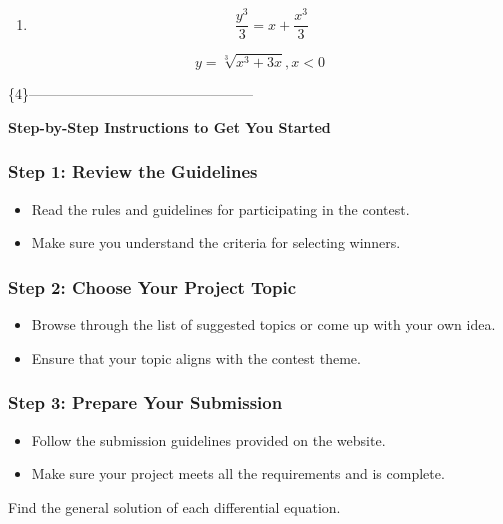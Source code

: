 \documentclass[
]{article}
\providecommand{\tightlist}{%
  \setlength{\itemsep}{0pt}\setlength{\parskip}{0pt}}
\begin{document}
\begin{enumerate}
\def\labelenumi{\arabic{enumi})}
\setcounter{enumi}{11}
\tightlist
\item
  \[\frac{y^3}{3} = x + \frac{x^3}{3}\]
\end{enumerate}

\[y = \sqrt[3]{x^3 + 3x}, x < 0\]

\{4\}------------------------------------------------

\textbf{Step-by-Step Instructions to Get You Started}

\subsubsection{Step 1: Review the
Guidelines}\label{step-1-review-the-guidelines}

\begin{itemize}
\tightlist
\item
  Read the rules and guidelines for participating in the contest.
\item
  Make sure you understand the criteria for selecting winners.
\end{itemize}

\subsubsection{Step 2: Choose Your Project
Topic}\label{step-2-choose-your-project-topic}

\begin{itemize}
\tightlist
\item
  Browse through the list of suggested topics or come up with your own
  idea.
\item
  Ensure that your topic aligns with the contest theme.
\end{itemize}

\subsubsection{Step 3: Prepare Your
Submission}\label{step-3-prepare-your-submission}

\begin{itemize}
\tightlist
\item
  Follow the submission guidelines provided on the website.
\item
  Make sure your project meets all the requirements and is complete.
\end{itemize}

Find the general solution of each differential equation.
\end{document}

